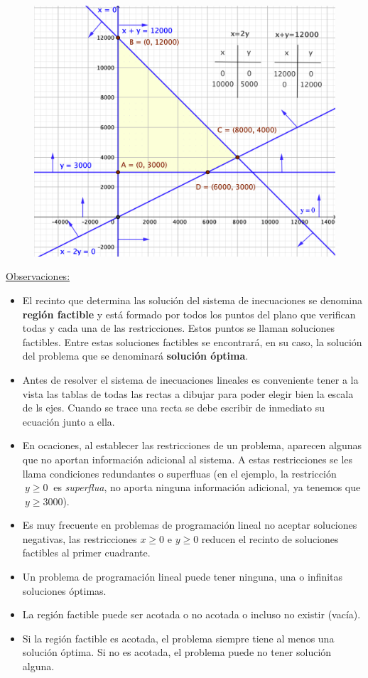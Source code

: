 \begin{figure}[H]
	\centering
	\includegraphics[width=.8\textwidth]{imagenes/img11.png}
\end{figure}

\vspace{5mm} \underline{Observaciones:}

\renewcommand{\labelitemi}{$\checkmark$}
\begin{itemize}

\item El recinto que determina las solución del sistema de inecuaciones se denomina \textbf{región factible} y está formado por todos los puntos del plano que verifican todas y cada una de las restricciones. Estos puntos se llaman soluciones factibles. Entre estas soluciones factibles se encontrará, en su caso, la solución del problema que se denominará \textbf{solución óptima}.
\item Antes de resolver el sistema de inecuaciones lineales es conveniente tener a la vista las tablas de todas las rectas a dibujar para poder elegir bien la escala de ls ejes. Cuando se trace una recta se debe escribir de inmediato su ecuación junto a ella.
\item En ocaciones, al establecer las restricciones de un problema, aparecen algunas que no aportan información adicional al sistema. A estas restricciones se les llama condiciones redundantes o superfluas (en el ejemplo, la restricción $\ y\ge 0 \ $ es \emph{superflua}, no aporta ninguna información adicional, ya tenemos que $\ y\ge 3000 $). 
\item Es muy frecuente en problemas de programación lineal no aceptar soluciones negativas, las restricciones $x\ge 0$ e $y\ge 0$ reducen el recinto de soluciones factibles al primer cuadrante.
\item Un problema de programación lineal puede tener ninguna, una o infinitas soluciones óptimas.
\item La región factible puede ser acotada o no acotada o incluso no existir (vacía).
\item Si la región factible es acotada, el problema siempre tiene al menos una solución óptima. Si no es acotada, el problema puede no tener solución alguna.
		
\end{itemize}


